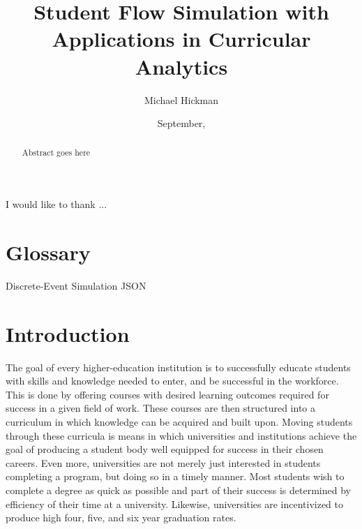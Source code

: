 \documentclass[botnum, fleqn]{unmeethesis}
\begin{document}
\frontmatter

\title{Student Flow Simulation with Applications in Curricular Analytics}
\author{Michael Hickman}
\date{September, \thisyear}

\maketitle
\makecopyright




\begin{acknowledgments}
  \vspace{1.1in}
  I would like to thank ...
\end{acknowledgments}


\maketitleabstract

\begin{abstract}
  Abstract goes here
  \clearpage
\end{abstract}


\tableofcontents
\listoffigures


\chapter{Glossary}
Discrete-Event Simulation
JSON
\mainmatter


\chapter{Introduction}
The goal of every higher-education institution is to successfully educate students with skills and knowledge needed to enter, and be successful in the workforce. This is done by offering courses with desired learning outcomes required for success in a given field of work. These courses are then structured into a curriculum in which knowledge can be acquired and built upon. Moving students through these curricula is means in which universities and institutions achieve the goal of producing a student body well equipped for success in their chosen careers. Even more, universities are not merely just interested in students completing a program, but doing so in a timely manner. Most students wish to complete a degree as quick as possible and part of their success is determined by efficiency of their time at a university. Likewise, universities are incentivized to produce high four, five, and six year graduation rates.
\end{document}
